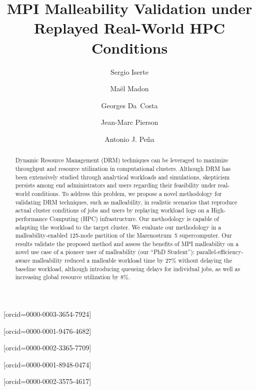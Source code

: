 \documentclass[a4paper,fleqn]{cas-dc}
\begin{document}
\let\WriteBookmarks\relax
\def\floatpagepagefraction{1}
\def\textpagefraction{.001}



\title [mode = title]{MPI Malleability Validation under Replayed Real-World HPC Conditions}


\author[1]{Sergio Iserte}[orcid=0000-0003-3654-7924]
\cormark[1]

\author[2]{Maël Madon}[orcid=0000-0001-9476-4682]
\author[2]{Georges Da~Costa}[orcid=0000-0002-3365-7709]
\author[2]{Jean-Marc Pierson}[orcid=0000-0001-8948-0474]
\author[1]{Antonio J. Peña}[orcid=0000-0002-3575-4617]

            




\begin{abstract}
Dynamic Resource Management (DRM) techniques can be leveraged to maximize throughput and resource utilization in computational clusters.
Although DRM has been extensively studied through analytical workloads and simulations, skepticism persists among end administrators and users regarding their feasibility under real-world conditions.
To address this problem, we propose a novel methodology for validating DRM techniques, such as malleability, in realistic scenarios that reproduce actual cluster conditions of jobs and users by replaying workload logs on a High-performance Computing (HPC) infrastructure.
Our methodology is capable of adapting the workload to the target cluster.
We evaluate our methodology in a malleability-enabled 125-node partition of the Marenostrum~5 supercomputer. Our results validate the proposed method and assess the benefits of MPI malleability on a novel use case of a pioneer user of malleability (our ``PhD Student''): parallel-efficiency-aware malleability reduced a malleable workload time by 27\% without delaying the baseline workload, although introducing queueing delays for individual jobs, as well as increasing global resource utilization by 8\%.
\end{abstract}
\end{document}
